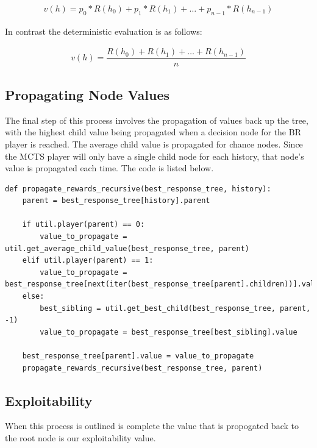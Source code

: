 \begin{align}
    v(h) = p_0*R(h_0) + p_1*R(h_1) + \dots + p_{n-1}*R(h_{n-1})
\end{align}

In contrast the deterministic evaluation is as follows:

\begin{align}
    v(h) = \dfrac{R(h_0) + R(h_1) + \dots + R(h_{n-1})}{n}
\end{align}

\subsection{Propagating Node Values}\label{subsec:propagateTerminals}
The final step of this process involves the propagation of values back up the tree, with the highest
child value being propagated when a decision node for the BR player is reached.
The average child value is propagated for chance nodes.
Since the MCTS player will only have a single child node for each history, that node's value is
propagated each time.
The code is listed below.

\begin{lstlisting}[style=Python]
def propagate_rewards_recursive(best_response_tree, history):
    parent = best_response_tree[history].parent

    if util.player(parent) == 0:
        value_to_propagate = util.get_average_child_value(best_response_tree, parent)
    elif util.player(parent) == 1:
        value_to_propagate = best_response_tree[next(iter(best_response_tree[parent].children))].value
    else:
        best_sibling = util.get_best_child(best_response_tree, parent, -1)
        value_to_propagate = best_response_tree[best_sibling].value

    best_response_tree[parent].value = value_to_propagate
    propagate_rewards_recursive(best_response_tree, parent)
\end{lstlisting}

\subsection{Exploitability}\label{subsec:exploitability}
When this process is outlined is complete the value that is propogated back to the
root node is our exploitability value.

